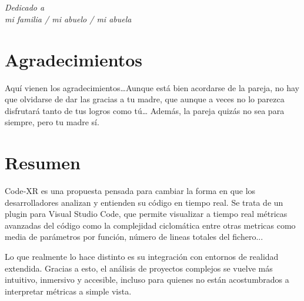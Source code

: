 \documentclass[a4paper, 12pt]{book}
\begin{document}

\chapter*{}
\begin{flushright}
\textit{Dedicado a \\
mi familia / mi abuelo / mi abuela}
\end{flushright}


\chapter*{Agradecimientos}

Aquí vienen los agradecimientos\ldots Aunque está bien acordarse de la pareja, no hay que olvidarse de dar las gracias a tu madre, que aunque a veces no lo parezca disfrutará tanto de tus logros como tú\ldots 
Además, la pareja quizás no sea para siempre, pero tu madre sí.


\chapter*{Resumen}

Code‑XR es una propuesta pensada para cambiar la forma en que los desarrolladores analizan y entienden su código en tiempo real. Se trata de un plugin para Visual Studio Code, que permite visualizar a tiempo real métricas avanzadas del código como la complejidad ciclomática entre otras metricas como media de parámetros por función, número de lineas totales del fichero...

Lo que realmente lo hace distinto es su integración con entornos de realidad extendida. Gracias a esto, el análisis de proyectos complejos se vuelve más intuitivo, inmersivo y accesible, incluso para quienes no están acostumbrados a interpretar métricas a simple vista.
\end{document}
